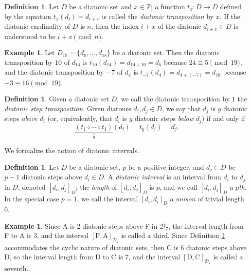 \documentclass{article}
\theoremstyle{plain}
\theoremstyle{definition}
\newtheorem{definition}[theorem]{Definition}
\newtheorem{example}[theorem]{Example}
\theoremstyle{remark}
\begin{document}
\begin{definition}
	Let $D$ be a diatonic set and $x\in\mathbb{Z}$; a function $t_x:D\to D$ defined by the equation $t_x(d_i)=d_{i+x}$ is called the \textit{diatonic transposition} by $x$. If the diatonic cardinality of $D$ is $n$, then the index $i+x$ of the diatonic $d_{i+x}\in D$ is understood to be $i+x\pmod{n}$.
\end{definition}

\begin{example}
	Let $D_{19}=\{d_0,\dots,d_{18}\}$ be a diatonic set. Then the diatonic transposition by $10$ of $d_{14}$ is $t_{10}(d_{14})=d_{14+10}=d_5$ because $24\equiv 5\pmod{19}$, and the diatonic transposition by $-7$ of $d_4$ is $t_{-7}(d_4)=d_{4+(-7)}=d_{16}$ because $-3\equiv 16\pmod{19}$.
\end{example}

\begin{definition}
	Given a diatonic set $D$, we call the diatonic transposition by $1$ the \textit{diatonic step transposition}. Given diatones $d_i,d_j\in D$, we say that $d_j$ is $y$ diatonic steps \textit{above} $d_i$ (or, equivalently, that $d_i$ is $y$ diatonic steps \textit{below} $d_j$) if and only if $$\underbrace{(t_1\circ\cdots\circ t_1)}_y(d_i)=t_y(d_i)=d_j.$$
\end{definition}

We formalize the notion of diatonic intervals.

\begin{definition}
\label{DEF.Interval}
	Let $D$ be a diatonic set, $p$ be a positive integer, and $d_j\in D$ be $p-1$ diatonic steps above $d_i\in D$. A \textit{diatonic interval} is an interval from $d_i$ to $d_j$ in $D$, denoted $[d_i,d_j]_D$; the \textit{length} of $[d_i,d_j]_D$ is $p$, and we call $[d_i,d_j]_D$ a \textit{$p$th}. In the special case $p=1$, we call the interval $[d_i,d_i]_D$ a \textit{unison} of trivial length $0$.
\end{definition}

\begin{example}
	Since A is $2$ diatonic steps above F in $\mathcal{D}_7$, the interval length from F to A is $3$, and the interval $[\textrm{F},\textrm{A}]_{\mathcal{D}_7}$ is called a third. Since Definition \ref{DEF.Interval} accommodates the cyclic nature of diatonic sets, then C is $6$ diatonic steps above D, so the interval length from D to C is $7$, and the interval $[\textrm{D},\textrm{C}]_{\mathcal{D}_7}$ is called a seventh.
\end{example}
\end{document}
